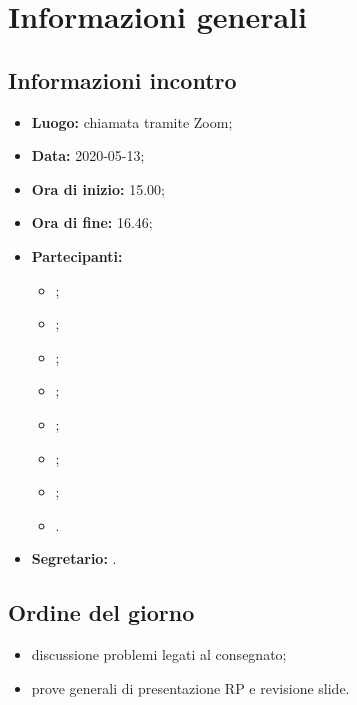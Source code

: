 \section{Informazioni generali}
\subsection{Informazioni incontro}
\begin{itemize}
	\item \textbf{Luogo:} chiamata tramite Zoom;
	\item \textbf{Data:} 2020-05-13;
	\item \textbf{Ora di inizio:} 15.00;
	\item \textbf{Ora di fine:} 16.46;
	\item \textbf{Partecipanti:}
		\begin{itemize}
			\item \VB;
			\item \LB;
			\item \NF;
			\item \EG;
			\item \FJ;
			\item \MP;
			\item \AS;
			\item \AZ.
		\end{itemize}
	\item \textbf{Segretario:} \AS.
\end{itemize}

\subsection{Ordine del giorno}
\begin{itemize}
	\item discussione problemi legati al \PdP{} consegnato;
	\item prove generali di presentazione RP e revisione slide.
\end{itemize}
